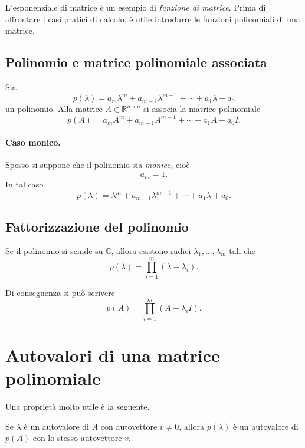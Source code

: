 L'esponenziale di matrice è un esempio di \emph{funzione di matrice}. Prima di affrontare i casi pratici di calcolo, è utile introdurre le funzioni polinomiali di una matrice.

\subsection{Polinomio e matrice polinomiale associata}

Sia
\[
p(\lambda)=a_m\lambda^m+a_{m-1}\lambda^{m-1}+\cdots+a_1\lambda+a_0
\]
un polinomio. Alla matrice $A\in\mathbb{R}^{n\times n}$ si associa la matrice polinomiale
\begin{equation}
p(A)=a_mA^m+a_{m-1}A^{m-1}+\cdots+a_1A+a_0I.
\label{eq:L5_poly_matrix}
\end{equation}

\paragraph{Caso monico.}
Spesso si suppone che il polinomio sia \emph{monico}, cioè
\[
a_m=1.
\]
In tal caso
\[
p(\lambda)=\lambda^m+a_{m-1}\lambda^{m-1}+\cdots+a_1\lambda+a_0.
\]

\subsection{Fattorizzazione del polinomio}

Se il polinomio si scinde su $\mathbb{C}$, allora esistono radici $\lambda_1,\dots,\lambda_m$ tali che
\[
p(\lambda)=\prod_{i=1}^{m}(\lambda-\lambda_i).
\]

Di conseguenza si può scrivere
\begin{equation}
p(A)=\prod_{i=1}^{m}(A-\lambda_i I).
\label{eq:L5_factorized_poly_matrix}
\end{equation}

\section{Autovalori di una matrice polinomiale}

Una proprietà molto utile è la seguente.

\begin{proposizione}
Se $\lambda$ è un autovalore di $A$ con autovettore $v\neq 0$, allora $p(\lambda)$ è un autovalore di $p(A)$ con lo stesso autovettore $v$.
\end{proposizione}

